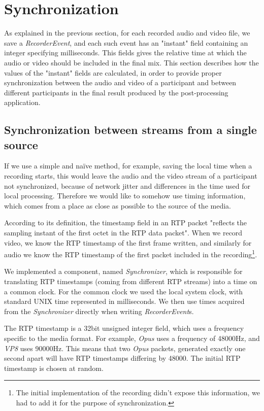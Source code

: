 \documentclass[twoside,openright,a4paper,12pt,english]{article}
\begin{document}
\section{Synchronization}
\label{synchronization}
As explained in the previous section, for each recorded audio and video file,
we save a \emph{RecorderEvent}, and each such event has an "instant" field 
containing an integer specifying milliseconds. This fields gives the relative time
at which the audio or video should be included in the final mix. This section describes how
the values of the "instant" fields are calculated, in order to provide
proper synchronization between the audio and video of a participant and
between different participants in the final result produced by the post-processing
application.

\subsection{Synchronization between streams from a single source}
If we use a simple and naïve method, for example, saving the local time when a
recording starts, this would leave the audio and the video stream of a
participant not synchronized, because of network jitter and differences in the
time used for local processing. Therefore we would like to somehow use timing information,
which comes from a place as close as possible to the source of the media.

According to its definition, the timestamp field in an RTP packet "reflects the sampling instant of the
first octet in the RTP data packet"\cite{rtp}. When we record video, we know the
RTP timestamp of the first frame written, and similarly for audio we know the RTP timestamp of the
first packet included in the recording\footnote{The initial
implementation of the recording didn't expose this information, we had to add
it for the purpose of synchronization.}.

We implemented a component, named \emph{Synchronizer}, which is responsible for translating
RTP timestamps (coming from different RTP streams) into a time on a common clock. For the common
clock we used the local system clock, with standard UNIX time represented in milliseconds. We then use times acquired from the \emph{Synchronizer} directly when writing \emph{RecorderEvent}s.

\medskip
The RTP timestamp is a 32bit unsigned integer field, which uses a frequency
specific to the media format. For example, \emph{Opus} uses a frequency of
48000Hz, and \emph{VP8} uses 90000Hz. This means that two \emph{Opus} packets,
generated exactly one second apart will have RTP timestamps differing by 48000.
The initial RTP timestamp is chosen at random.
\end{document}
